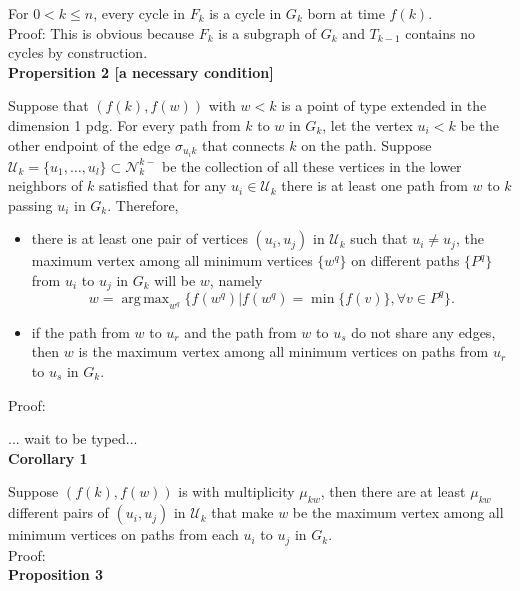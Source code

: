 \documentclass[a4paper,12pt]{article}
\numberwithin{equation}{section}
\DeclareMathOperator*{\argmax}{arg\,max}
\begin{document}
	For $0 < k \leq n$, every cycle in $F_k$ is a cycle in $G_k$ born at time $f(k)$.\\
	
	\noindent Proof: This is obvious because $F_k$ is a subgraph of $G_k$ and $T_{k-1}$ contains no cycles by construction.\\
	
	\noindent \textbf{Propersition 2 [a necessary condition]}
	
	Suppose that $(f(k), f(w))$ with $w < k$ is a point of type extended in the dimension 1 pdg. For every path from $k$ to $w$ in $G_k$, let the vertex $u_i<k$ be the other endpoint of the edge $\sigma_{u_i k}$ that connects $k$ on the path. Suppose $\mathcal{U}_k = \{u_1,\ldots, u_l\} \subset \mathcal{N}_{k}^{k-}$ be the collection of all these vertices in the lower neighbors of $k$ satisfied that for any $u_i \in \mathcal{U}_k$ there is at least one path from $w$ to $k$ passing $u_i$ in $G_k$. Therefore, 
	\begin{itemize}
	 \item there is at least one pair of vertices $(u_i, u_j)$ in $\mathcal{U}_k$ such that $u_i \neq u_j$, the maximum vertex among all minimum vertices $\{ w^q \}$ on different paths $\{ P^q \}$ from $u_i$ to $u_j$ in $G_k$ will be $w$, namely 
	$$w = \argmax_{w^q} \{ f(w^q) \vert f(w^q) = \min \{ f(v) \}, \forall v \in P^{q}  \}.$$
	
	\item if the path from $w$ to $u_r$ and the path from $w$ to $u_s$ do not share any edges, then $w$ is the maximum vertex among all minimum vertices on paths from $u_r$ to $u_s$ in $G_k$.
	\end{itemize}	
	
	\noindent Proof:
	
	{... wait to be typed...}\\
	
	
	\noindent \textbf{Corollary 1}
	
	Suppose $(f(k), f(w))$ is with multiplicity $\mu_{kw}$, then there are at least $\mu_{kw}$ different pairs of $(u_i,u_j)$ in $\mathcal{U}_k$ that make $w$ be the maximum vertex among all minimum vertices on paths from each $u_i$ to $u_j$ in $G_k$.\\
	
	\noindent Proof:\\
	
	
	\noindent \textbf{Proposition 3}
	
\end{document}
